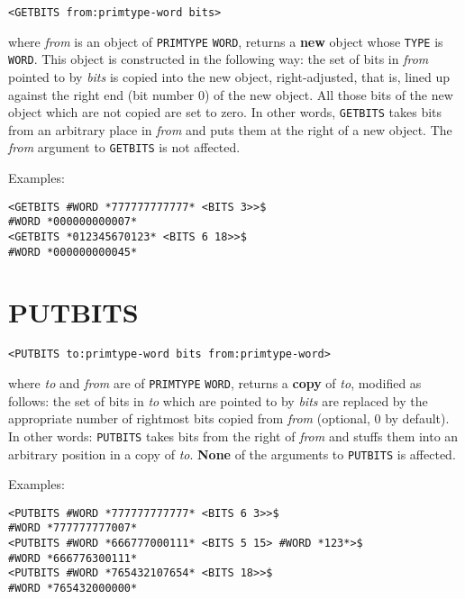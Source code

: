 \documentclass[a4paper]{scrbook}
\begin{document}
\begin{verbatim}
<GETBITS from:primtype-word bits>
\end{verbatim}

 where \emph{from} is an object of \texttt{PRIMTYPE} \texttt{WORD}, returns a \textbf{new}
object whose \texttt{TYPE} is \texttt{WORD}. This object is constructed in the following way: the set of bits in
\emph{from} pointed to by \emph{bits} is copied into the new object, right-adjusted, that is, lined up against the right
end (bit number 0) of the new object. All those bits of the new object which are not copied are set to zero. In other
words, \texttt{GETBITS} takes bits from an arbitrary place in \emph{from} and puts them at the right of a new object. The
\emph{from} argument to \texttt{GETBITS} is not affected.

Examples:

\begin{verbatim}
<GETBITS #WORD *777777777777* <BITS 3>>$
#WORD *000000000007*
<GETBITS *012345670123* <BITS 6 18>>$
#WORD *000000000045*
\end{verbatim}

\section{PUTBITS}\label{putbits}

\begin{verbatim}
<PUTBITS to:primtype-word bits from:primtype-word>
\end{verbatim}

 where \emph{to} and \emph{from} are of \texttt{PRIMTYPE} \texttt{WORD}, returns a
\textbf{copy} of \emph{to}, modified as follows: the set of bits in \emph{to} which are pointed to by \emph{bits} are
replaced by the appropriate number of rightmost bits copied from \emph{from} (optional, 0 by default). In other words:
\texttt{PUTBITS} takes bits from the right of \emph{from} and stuffs them into an arbitrary position in a copy of
\emph{to}. \textbf{None} of the arguments to \texttt{PUTBITS} is affected.

Examples:

\begin{verbatim}
<PUTBITS #WORD *777777777777* <BITS 6 3>>$
#WORD *777777777007*
<PUTBITS #WORD *666777000111* <BITS 5 15> #WORD *123*>$
#WORD *666776300111*
<PUTBITS #WORD *765432107654* <BITS 18>>$
#WORD *765432000000*
\end{verbatim}
\end{document}
